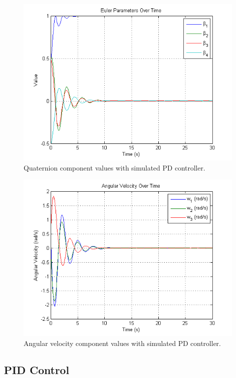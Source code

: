 \documentclass[letterpaper, 11 pt, conference]{ieeeconf}  %
\begin{document}
\begin{figure}
  \centering
  \includegraphics[width=\linewidth]{pdControllerBeta}
  \caption{Quaternion component values with simulated PD controller.}
  \label{fig:pdControllerBeta}
\end{figure}

\begin{figure}
  \centering
  \includegraphics[width=\linewidth]{pdControllerOmega}
  \caption{Angular velocity component values with simulated PD controller.}
  \label{fig:pdControllerOmega}
\end{figure}

\subsection{PID Control}
\end{document}
